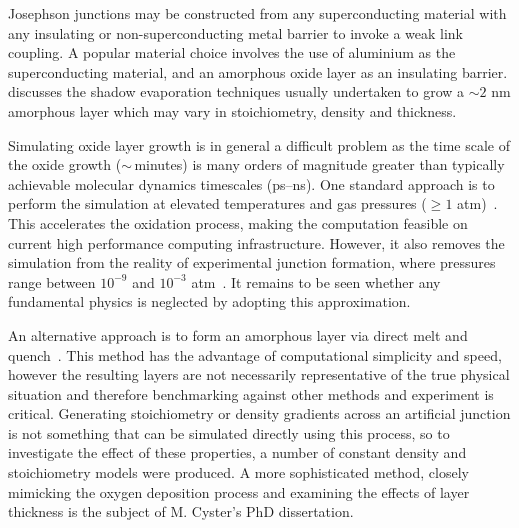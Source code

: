 Josephson junctions may be constructed from any superconducting material with any insulating or non-superconducting metal barrier to invoke a weak link coupling.
A popular material choice involves the use of aluminium as the superconducting material, and an amorphous oxide layer as an insulating barrier.
 discusses the shadow evaporation techniques usually undertaken to grow a $\sim2$ nm amorphous layer which may vary in stoichiometry, density and thickness.

Simulating oxide layer growth is in general a difficult problem as the time scale of the oxide growth ($\sim\,$minutes) is many orders of magnitude greater than typically achievable molecular dynamics timescales (ps--ns).
One standard approach is to perform the simulation at elevated temperatures and gas pressures ($\ge 1$ atm)~\cite{Campbell1999, Zhou2005, Hasnaoui2005}.
This accelerates the oxidation process, making the computation feasible on current high performance computing infrastructure.
However, it also removes the simulation from the reality of experimental junction formation, where pressures range between $10^{-9}$ and $10^{-3}$ atm~\cite{Morohashi1987, Kohlstedt1993, Jeurgens2002}.
It remains to be seen whether any fundamental physics is neglected by adopting this approximation.

An alternative approach is to form an amorphous layer via direct melt and quench~\cite{Vashishta2008,Sheng2012}.
This method has the advantage of computational simplicity and speed, however the resulting layers are not necessarily representative of the true physical situation and therefore benchmarking against other methods and experiment is critical.
Generating stoichiometry or density gradients across an artificial junction is not something that can be simulated directly using this process, so to investigate the effect of these properties, a number of constant density and stoichiometry models were produced. A more sophisticated method, closely mimicking the oxygen deposition process and examining the effects of layer thickness is the subject of M. Cyster's PhD dissertation.


